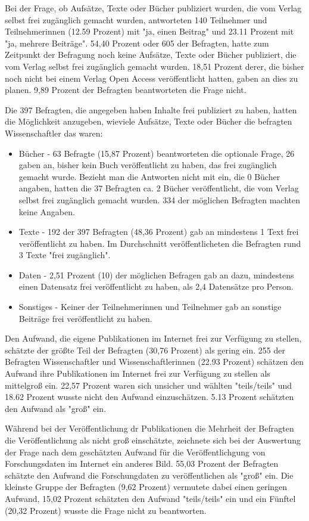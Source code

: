 Bei der Frage, ob Aufsätze, Texte oder Bücher publiziert wurden, die vom Verlag selbst frei zugänglich gemacht wurden, antworteten 140 Teilnehmer und Teilnehmerinnen (12.59 Prozent) mit "ja, einen Beitrag" und 23.11 Prozent mit "ja, mehrere Beiträge". 54,40 Prozent oder 605 der Befragten, hatte zum Zeitpunkt der Befragung noch keine Aufsätze, Texte oder Bücher publiziert, die vom Verlag selbst frei zugänglich gemacht wurden.  18,51 Prozent derer, die bisher noch nicht bei einem Verlag Open Access veröffentlicht hatten, gaben an dies zu planen. 9,89 Prozent der Befragten beantworteten die Frage nicht.

Die 397 Befragten, die angegeben haben Inhalte frei publiziert zu haben, hatten die Möglichkeit anzugeben, wieviele Aufsätze, Texte oder Bücher die befragten Wissenschaftler das waren:
\begin{itemize}
\item Bücher - 63 Befragte (15,87 Prozent) beantworteten die optionale Frage, 26 gaben an, bisher kein Buch veröffentlicht zu haben, das frei zugänglich gemacht wurde. Bezieht man die Antworten nicht mit ein, die 0 Bücher angaben, hatten die 37 Befragten ca. 2 Bücher veröffentlicht, die vom Verlag selbst frei zugänglich gemacht wurden. 334 der möglichen Befragten machten keine Angaben.
\item Texte - 192 der 397 Befragten (48,36 Prozent) gab an mindestens 1 Text frei veröffentlicht zu haben. Im Durchschnitt veröffentlicheten die Befragten rund 3 Texte "frei zugänglich".
\item Daten - 2,51 Prozent (10) der möglichen Befragen gab an dazu, mindestens einen Datensatz frei veröffentlicht zu haben, als 2,4 Datensätze pro Person.
\item Sonstiges - Keiner der Teilnehmerinnen und Teilnehmer gab an sonstige Beiträge frei veröffentlicht zu haben.
\end{itemize}

Den Aufwand, die eigene Publikationen im Internet frei zur Verfügung zu stellen, schätzte der größte Teil der Befragten (30,76 Prozent) als gering ein. 255 der Befragten Wissenschaftler und Wissenschaftlerinnen (22.93 Prozent) schätzen den Aufwand ihre Publikationen im Internet frei zur Verfügung zu stellen als mittelgroß ein.  22,57 Prozent waren sich unsicher und wählten "teils/teils" und 18.62 Prozent wusste nicht den Aufwand einzuschätzen. 5.13 Prozent schätzten den Aufwand als "groß" ein.

Während bei der Veröffentlichung dr Publikationen die Mehrheit der Befragten die Veröffentlichung als nicht groß einschätzte, zeichnete sich bei der Auswertung der Frage nach dem geschätzten Aufwand für die Veröffentlichgung von Forschungsdaten im Internet ein anderes Bild. 55,03 Prozent der Befragten schätzte den Aufwand die Forschungdaten zu veröffentlichen als "groß" ein. Die kleinste Gruppe der Befragten (9,62 Prozent) vermutete dabei einen geringen Aufwand, 15,02 Prozent schätzten den Aufwand "teils/teils" ein und ein Fünftel (20,32 Prozent) wusste die Frage nicht zu beantworten.

